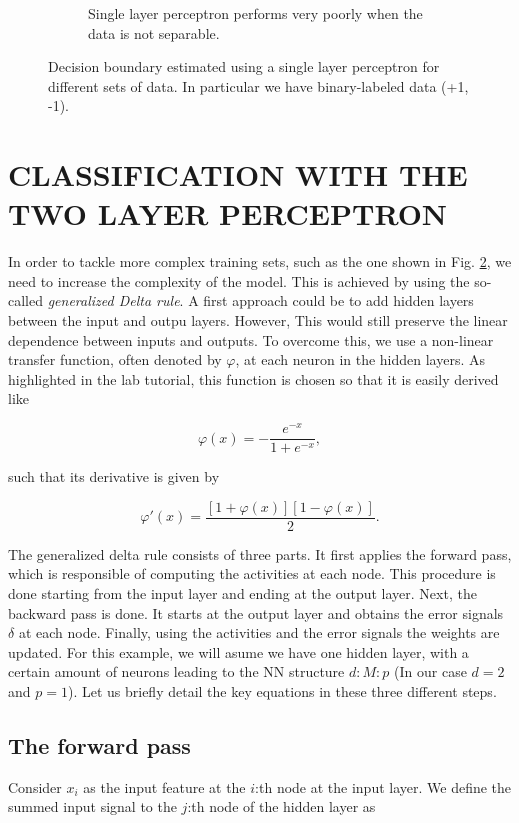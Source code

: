 \documentclass[letterpaper, 10 pt, conference]{ieeeconf}  %
\begin{document}
\begin{figure}
\begin{subfigure}[b]{0.49\textwidth}
        \caption{Single layer perceptron performs very poorly when the data is not separable.}
        \label{fig:ns}
    \end{subfigure}
    \caption{Decision boundary estimated using a single layer perceptron for different sets of data. In particular we have binary-labeled data (+1, -1).}
\end{figure}


\section{CLASSIFICATION WITH THE TWO LAYER PERCEPTRON}

In order to tackle more complex training sets, such as the one shown in Fig. \ref{fig:ns}, we need to increase the complexity of the model. This is achieved by using the so-called \emph{generalized Delta rule}. A first approach could be to add hidden layers between the input and outpu layers. However, This would still preserve the linear dependence between inputs and outputs. To overcome this, we use a non-linear transfer function, often denoted by $\varphi$, at each neuron in the hidden layers. As highlighted in the lab tutorial, this function is chosen so that it is easily derived like

$$
\varphi(x) = -\frac{e^{-x}}{1+e^{-x}},
$$

such that its derivative is given by

$$
\varphi'(x) = \frac{[1+\varphi(x)][1-\varphi(x)]}{2}.
$$

The generalized delta rule consists of three parts. It first applies the forward pass, which is responsible of computing the activities at each node. This procedure is done starting from the input layer and ending at the output layer. Next, the backward pass is done. It starts at the output layer and obtains the error signals $\delta$ at each node. Finally, using the activities and the error signals the weights are updated. For this example, we will asume we have one hidden layer, with a certain amount of neurons leading to the NN structure $d : M : p$ (In our case $d=2$ and $p=1$). Let us briefly detail the key equations in these three different steps.

\subsection{The forward pass}
Consider $x_i$ as the input feature at the $i$:th node at the input layer. We define the summed input signal to the $j$:th node of the hidden layer as
\end{document}
